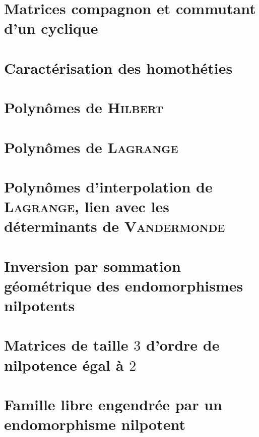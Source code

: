 \section{Matrices compagnon et commutant d'un cyclique}


\section{Caractérisation des homothéties}


\section{Polynômes de \textsc{Hilbert}} \label{polynome_hilbert}


\section{Polynômes de \textsc{Lagrange}} 


\section{Polynômes d'interpolation de \textsc{Lagrange}, lien avec les déterminants de \textsc{Vandermonde}}


\section{Inversion par sommation géométrique des endomorphismes nilpotents} \label{indice_nilpotence}


\section{Matrices de taille $3$ d'ordre de nilpotence égal à $2$}


\section{Famille libre engendrée par un endomorphisme nilpotent}


